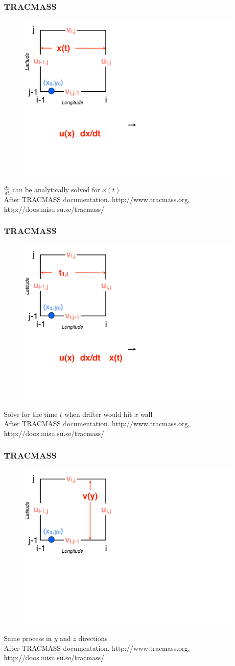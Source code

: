 \documentclass[ignorenonframetext]{beamer}
\begin{document}
\begin{frame}[t,noframenumbering]\frametitle{TRACMASS}
	\begin{figure}[htbp]
		\centering
		\includegraphics[width=.5\textwidth]{figures/tracmass_box4}
	\end{figure}
	{\Large $\frac{dx}{dt}$ can be analytically solved for $x(t)$}
	\tiny{\\After TRACMASS documentation. http://www.tracmass.org, http://doos.misu.su.se/tracmass/}
\end{frame}
\begin{frame}[t,noframenumbering]\frametitle{TRACMASS}
	\begin{figure}[htbp]
		\centering
		\includegraphics[width=.5\textwidth]{figures/tracmass_box5}
	\end{figure}
	{\Large Solve for the time $t$ when drifter would hit $x$ wall}
	\tiny{\\After TRACMASS documentation. http://www.tracmass.org, http://doos.misu.su.se/tracmass/}
\end{frame}
\begin{frame}[t,noframenumbering]\frametitle{TRACMASS}
	\begin{figure}[htbp]
		\centering
		\includegraphics[width=.5\textwidth]{figures/tracmass_box6}
	\end{figure}
	{\Large Same process in $y$ and $z$ directions}
	\tiny{\\After TRACMASS documentation. http://www.tracmass.org, http://doos.misu.su.se/tracmass/}
\end{frame}
\end{document}
